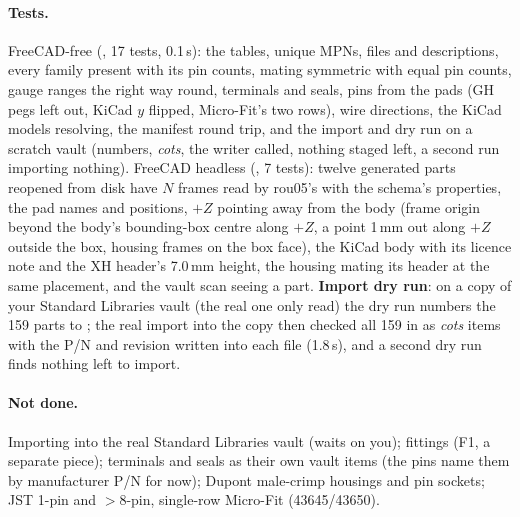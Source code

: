 \paragraph{Tests.} FreeCAD-free (, 17 tests, 0.1\,s): the
tables, unique MPNs, files and descriptions, every family present with its pin counts, mating symmetric with equal pin
counts, gauge ranges the right way round, terminals and seals, pins from the pads (GH pegs left out, KiCad $y$ flipped,
Micro-Fit's two rows), wire directions, the KiCad models resolving, the manifest round trip, and the import and dry
run on a scratch vault (numbers, \emph{cots}, the writer called, nothing staged left, a second run importing nothing).
FreeCAD headless (, 7 tests): twelve generated parts reopened from disk have
$N$ frames read by rou05's  with the schema's properties, the pad names and positions, $+Z$ pointing away
from the body (frame origin beyond the body's bounding-box centre along $+Z$, a point 1\,mm out along $+Z$ outside the
box, housing frames on the box face), the KiCad body with its licence note and the XH header's 7.0\,mm height, the
housing mating its header at the same placement, and the vault scan seeing a part. \textbf{Import dry run}: on a copy
of your Standard Libraries vault (the real one only read) the dry run numbers the 159 parts
 to ; the real import into the copy then checked all 159 in as
\emph{cots} items with the P/N and revision written into each file (1.8\,s), and a second dry run finds nothing left to
import.

\paragraph{Not done.} Importing into the real Standard Libraries vault (waits on you); fittings (F1, a separate
piece); terminals and seals as their own vault items (the pins name them by manufacturer P/N for now); Dupont
male-crimp housings and pin sockets; JST 1-pin and $>8$-pin, single-row Micro-Fit (43645/43650).

